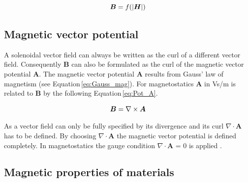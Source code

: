\begin{equation}
\label{eq:nonlin_B}
\centering
\boldsymbol{B} = f(\vert\boldsymbol{H}\vert)
\end{equation}

\subsection{Magnetic vector potential}
\label{subsec:Mag_pot}
A solenoidal vector field can always be written as the curl of a different vector field. Consequently $\boldsymbol{B}$ can also be formulated as the curl of the magnetic vector potential $\boldsymbol{A}$. The magnetic vector potential $\boldsymbol{A}$ results from Gauss' law of magnetism (see Equation\,\ref{eq:Gauss_mag}). For magnetostatics $\boldsymbol{A}$ in Vs/m is related to $\boldsymbol{B}$ by the following Equation\,\ref{eq:Pot_A}.  

\begin{equation}
\label{eq:Pot_A}
\centering
\boldsymbol{B} = \nabla\times\boldsymbol{A}
\end{equation}

As a vector field can only be fully specified by its divergence and its curl $\nabla\cdotp\boldsymbol{A}$ has to be defined. By choosing $\nabla\cdotp\boldsymbol{A}$ the magnetic vector potential is defined completely. In magnetostatics the gauge condition $\nabla\cdotp\boldsymbol{A}$ = 0 is applied \cite{schwab2013begriffswelt}.   

\subsection{Magnetic properties of materials}
\label{subsec:Mag_mat}



